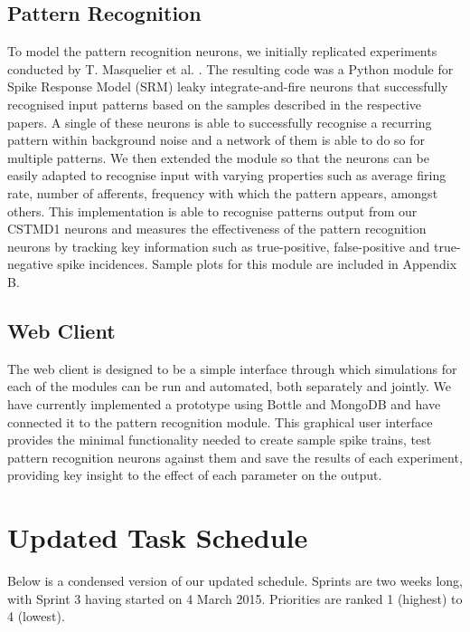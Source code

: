 \documentclass[a4paper,11pt]{article}
\begin{document}
\subsection{Pattern Recognition}
To model the pattern recognition neurons, we initially replicated experiments conducted by T. Masquelier et al. \cite{stdp1, stdp2}. The resulting code was a Python module for Spike Response Model (SRM) leaky integrate-and-fire neurons that successfully recognised input patterns based on the samples described in the respective papers. A single of these neurons is able to successfully recognise a recurring pattern within background noise and a network of them is able to do so for multiple patterns. We then extended the module so that the neurons can be easily adapted to recognise input with varying properties such as average firing rate, number of afferents, frequency with which the pattern appears, amongst others. This implementation is able to recognise patterns output from our CSTMD1 neurons and measures the effectiveness of the pattern recognition neurons by tracking key information such as true-positive, false-positive and true-negative spike incidences. Sample plots for this module are included in Appendix B.

\subsection{Web Client}
The web client is designed to be a simple interface through which simulations for each of the modules can be run and automated, both separately and jointly. We have currently implemented a prototype using Bottle and MongoDB and have connected it to the pattern recognition module. This graphical user interface provides the minimal functionality needed to create sample spike trains, test pattern recognition neurons against them and save the results of each experiment, providing key insight to the effect of each parameter on the output.


\section{Updated Task Schedule}	

Below is a condensed version of our updated schedule. Sprints are two weeks long, with Sprint 3 having started on 4 March 2015. Priorities are ranked 1 (highest) to 4 (lowest). 
\end{document}
